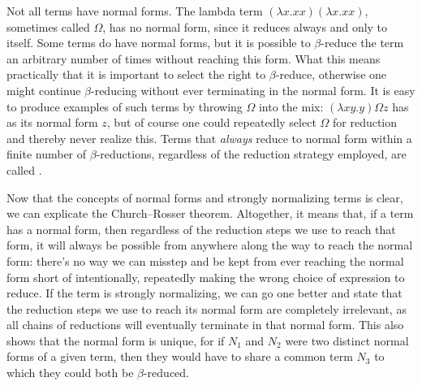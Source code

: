 Not all terms have normal forms. The lambda term $(\lambda x.xx)(\lambda x.xx)$, sometimes called $\Omega$, has no normal form, since it reduces always and only to itself. Some terms do have normal forms, but it is possible to $\beta$-reduce the term an arbitrary number of times without reaching this form. What this means practically that it is important to select the right  to $\beta$-reduce, otherwise one might continue $\beta$-reducing without ever terminating in the normal form. It is easy to produce examples of such terms by throwing $\Omega$ into the mix: $(\lambda xy.y) \Omega z$ has as its normal form $z$, but of course one could repeatedly select $\Omega$ for reduction and thereby never realize this. Terms that \emph{always} reduce to normal form within a finite number of $\beta$-re\-duc\-tions, regardless of the reduction strategy employed, are called .

Now that the concepts of normal forms and strongly normalizing terms is clear, we can explicate the Church--Rosser theorem. Altogether, it means that, if a term has a normal form, then regardless of the reduction steps we use to reach that form, it will always be possible from anywhere along the way to reach the normal form: there's no way we can misstep and be kept from ever reaching the normal form short of intentionally, repeatedly making the wrong choice of expression to reduce. If the term is strongly normalizing, we can go one better and state that the reduction steps we use to reach its normal form are completely irrelevant, as all chains of reductions will eventually terminate in that normal form. This also shows that the normal form is unique, for if $N_{1}$ and $N_{2}$ were two distinct normal forms of a given term, then they would have to share a common term $N_{3}$ to which they could both be $\beta$-reduced.

